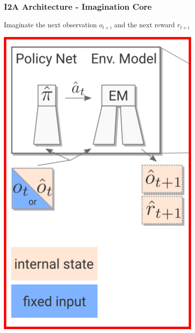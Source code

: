 \begin{frame}
    \frametitle{I2A Architecture - Imagination Core}

\begin{multicols}{2}
	\begin{PraesentationAufzaehlung}
	    \item Imaginate the next observation $o_{t+i}$ and the next reward $r_{t+i}$
	\end{PraesentationAufzaehlung}
    \vfill\columnbreak
	\begin{center}
    \includegraphics[height=0.5\textheight]{./Images/i2a_imagination_core.png}%
	\end{center}
\end{multicols}
    
\end{frame}
\clearpage

